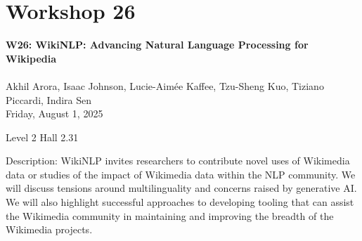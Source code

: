 \clearpage


\section[W26: WikiNLP: Advancing Natural Language Processing for Wikipedia]{Workshop 26}
\label{workshop_26}

\begin{center}
    {\Large \textbf{W26: WikiNLP: Advancing Natural Language Processing for Wikipedia}}\\
    
\\

Akhil Arora, Isaac Johnson, Lucie-Aimée Kaffee, Tzu-Sheng Kuo, Tiziano Piccardi, Indira Sen\\

    Friday, August 1, 2025

Level 2 Hall 2.31
    
\end{center}

Description: WikiNLP invites researchers to contribute novel uses of Wikimedia data or studies of the impact of Wikimedia data within the NLP community. We will discuss tensions around multilinguality and concerns raised by generative AI. We will also highlight successful approaches to developing tooling that can assist the Wikimedia community in maintaining and improving the breadth of the Wikimedia projects.

